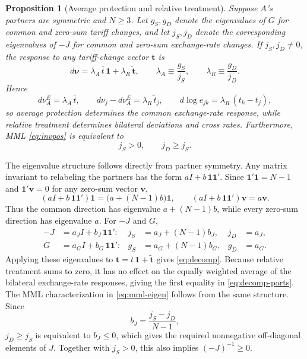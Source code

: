 \documentclass[11pt]{article}
\newtheorem{proposition}[theorem]{Proposition}
\begin{document}
\begin{proposition}[Average protection and relative treatment]
Suppose $A$'s partners are symmetric and $N\geq3$. Let $g_S,g_D$ denote the eigenvalues of $G$ for common and zero-sum tariff changes, and let $j_S,j_D$ denote the corresponding eigenvalues of $-J$ for common and zero-sum exchange-rate changes. If $j_S,j_D\neq0$, the response to any tariff-change vector $\mathbf{t}$ is
\begin{equation}
d\boldsymbol{\nu}=\lambda_A\,\bar t\,\mathbf{1}+\lambda_R\,\widetilde{\mathbf{t}}, \qquad \lambda_A\equiv\frac{g_S}{j_S}, \qquad \lambda_R\equiv\frac{g_D}{j_D}.
\label{eq:decomp}
\end{equation}
Hence
\begin{equation}
d\nu_A^E=\lambda_A\,\bar t, \qquad d\nu_j-d\nu_A^E=\lambda_R\,\tilde t_j, \qquad d\log e_{jk}=\lambda_R\,(t_k-t_j),
\label{eq:decomp-parts}
\end{equation}
so average protection determines the common exchange-rate response, while relative treatment determines bilateral deviations and cross rates. Furthermore, MML \eqref{eq:invpos} is equivalent to
\begin{equation}
j_S>0, \qquad j_D\geq j_S.
\label{eq:mml-eigen}
\end{equation}
\label{prop:decomposition}
\end{proposition}

\noindent The eigenvalue structure follows directly from partner symmetry. Any matrix invariant to relabeling the partners has the form $aI+b\,\mathbf{1}\mathbf{1}'$. Since $\mathbf{1}'\mathbf{1}=N-1$ and $\mathbf{1}'\mathbf{v}=0$ for any zero-sum vector $\mathbf{v}$,
\[
(aI+b\,\mathbf{1}\mathbf{1}')\mathbf{1}=\bigl(a+(N-1)b\bigr)\mathbf{1}, \qquad (aI+b\,\mathbf{1}\mathbf{1}')\mathbf{v}=a\mathbf{v}.
\]
Thus the common direction has eigenvalue $a+(N-1)b$, while every zero-sum direction has eigenvalue $a$. For $-J$ and $G$,
\begin{equation}
\begin{aligned}
-J &= a_JI+b_J\,\mathbf{1}\mathbf{1}' : & j_S &= a_J+(N-1)b_J, & j_D &= a_J, \\
G &= a_GI+b_G\,\mathbf{1}\mathbf{1}' : & g_S &= a_G+(N-1)b_G, & g_D &= a_G.
\end{aligned}
\label{eq:jg-eigen}
\end{equation}
Applying these eigenvalues to $\mathbf{t}=\bar t\,\mathbf{1}+\widetilde{\mathbf{t}}$ gives \eqref{eq:decomp}. Because relative treatment sums to zero, it has no effect on the equally weighted average of the bilateral exchange-rate responses, giving the first equality in \eqref{eq:decomp-parts}. The MML characterization in \eqref{eq:mml-eigen} follows from the same structure. Since
\[
b_J=\frac{j_S-j_D}{N-1},
\]
$j_D\geq j_S$ is equivalent to $b_J\leq0$, which gives the required nonnegative off-diagonal elements of $J$. Together with $j_S>0$, this also implies $(-J)^{-1}\geq0$.
\end{document}
